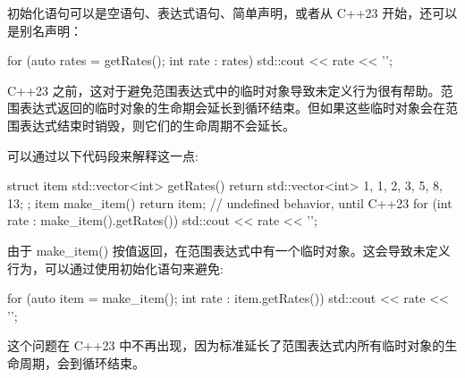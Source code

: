 初始化语句可以是空语句、表达式语句、简单声明，或者从 C++23 开始，还可以是别名声明：

\begin{cpp}
for (auto rates = getRates(); int rate : rates)
{
    std::cout << rate << '\n';
}
\end{cpp}

C++23 之前，这对于避免范围表达式中的临时对象导致未定义行为很有帮助。范围表达式返回的临时对象的生命期会延长到循环结束。但如果这些临时对象会在范围表达式结束时销毁，则它们的生命周期不会延长。

可以通过以下代码段来解释这一点:

\begin{cpp}
struct item
{
    std::vector<int> getRates()
    {
        return std::vector<int> {1, 1, 2, 3, 5, 8, 13};
    }
};
item make_item()
{
    return item{};
}
// undefined behavior, until C++23
for (int rate : make_item().getRates())
{
    std::cout << rate << '\n';
}
\end{cpp}

由于 make\_item() 按值返回，在范围表达式中有一个临时对象。这会导致未定义行为，可以通过使用初始化语句来避免:

\begin{cpp}
for (auto item = make_item(); int rate : item.getRates())
{
    std::cout << rate << '\n';
}
\end{cpp}

这个问题在 C++23 中不再出现，因为标准延长了范围表达式内所有临时对象的生命周期，会到循环结束。







